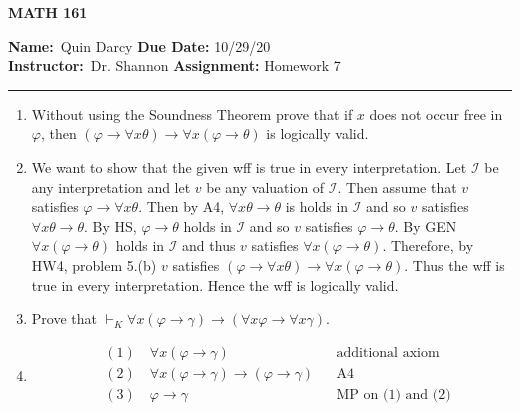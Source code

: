\documentclass[12pt]{article}
\makeatletter
\theoremstyle{definition}
\theoremstyle{remark}
\renewenvironment{proof}[1][\proofname]{\par
  \pushQED{\qed}%
  \normalfont \topsep6\p@\@plus6\p@\relax
  \list{}{\leftmargin=0mm
          \rightmargin=4mm
          \settowidth{\itemindent}{\itshape#1}%
          \labelwidth=\itemindent
          \parsep=0pt \listparindent=\parindent 
  }
  \item[\hskip\labelsep
        \itshape
    #1\@addpunct{.}]\ignorespaces
}{%
  \popQED\endlist\@endpefalse
}
\let\oldproofname=\proofname
\renewcommand{\proofname}{\bf{\textit{\oldproofname}}}
\makeatother
\begin{document}
\thispagestyle{empty}\hline

\begin{center}
	\vspace{.4cm} {\textbf { \large MATH 161}}
\end{center}
{\textbf{Name:}\ Quin Darcy \hspace{\fill} \textbf{Due Date:} 10/29/20   \\
{ \textbf{Instructor:}}\ Dr. Shannon \hspace{\fill} \textbf{Assignment:} Homework 7 \\ \hrule}

\justifying
    \begin{enumerate}[leftmargin=*]
        \item Without using the Soundness Theorem prove that if $x$ does not occur free in $\varphi$, then $(\varphi\rightarrow\forall x\theta)\rightarrow\forall x(\varphi\rightarrow\theta)$ is logically valid.
            \begin{proof}
                We want to show that the given wff is true in every interpretation. Let $\mathcal{I}$ be any interpretation and let $v$ be any valuation of $\mathcal{I}$. Then assume that $v$ satisfies $\varphi\rightarrow\forall x\theta$. Then by A4, $\forall x\theta\rightarrow\theta$ is holds in $\mathcal{I}$ and so $v$ satisfies $\forall x\theta\rightarrow\theta$. By HS, $\varphi\rightarrow\theta$ holds in  $\mathcal{I}$ and so $v$ satisfies $\varphi\rightarrow\theta$. By GEN $\forall x(\varphi\rightarrow\theta)$ holds in $\mathcal{I}$ and thus $v$ satisfies $\forall x(\varphi\rightarrow\theta)$. Therefore, by HW4, problem 5.(b) $v$ satisfies $(\varphi\rightarrow\forall x\theta)\rightarrow\forall x(\varphi\rightarrow\theta)$. Thus the wff is true in every interpretation. Hence the wff is logically valid.
            \end{proof}
        \item Prove that $\vdash_K\forall x(\varphi\rightarrow\gamma)\rightarrow(\forall x\varphi\rightarrow\forall x\gamma)$.
            \begin{proof}
                \begin{align*}
                    &(1) \quad\forall x(\varphi\rightarrow\gamma) && \text{additional axiom} \\
                    &(2) \quad\forall x(\varphi\rightarrow\gamma)\rightarrow(\varphi\rightarrow\gamma) && \text{A4} \\
                    &(3) \quad\varphi\rightarrow\gamma && \text{MP on (1) and (2)} \\

\end{align*}
\end{proof}
\end{enumerate}
\end{document}

